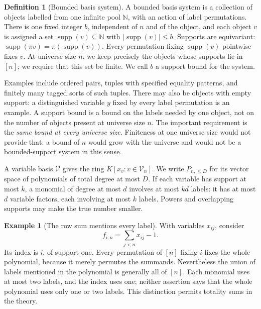 \documentclass[11pt,a4paper,oneside,openany]{book}
\theoremstyle{definition}\newtheorem{definition}[theorem]{Definition}
\newtheorem{example}[theorem]{Example}
\theoremstyle{remark}\newtheorem{remark}[theorem]{Remark}
\newcommand{\NN}{\mathbb N}\newcommand{\N}{\mathbb N}\newcommand{\Z}{\mathbb Z}\newcommand{\Q}{\mathbb Q}\newcommand{\Fp}{\mathbb F_p}
\DeclareMathOperator{\supp}{supp}\DeclareMathOperator{\im}{im}\DeclareMathOperator{\Span}{span}
\numberwithin{equation}{chapter}
\begin{document}
\begin{definition}[Bounded basis system]\label{tx:def:basis}
A bounded basis system is a collection of objects labelled from one
infinite pool $\NN$, with an action of label permutations. There is
one fixed integer $b$, independent of $n$ and of the object, and each
object $v$ is assigned a set $\supp(v)\subseteq\NN$ with
$|\supp(v)|\le b$. Supports are equivariant:
$\supp(\pi v)=\pi(\supp(v))$. Every permutation fixing
$\supp(v)$ pointwise fixes $v$. At universe size $n$, we keep precisely the
objects whose supports lie in $[n]$; we require that this set be finite.
We call $b$ a support bound for the system.
\end{definition}

Examples include ordered pairs, tuples with specified equality patterns,
and finitely many tagged sorts of such tuples. There may also be objects
with empty support: a distinguished variable $y$ fixed by every label
permutation is an example. A support bound is a bound on the labels
needed by one object, not on the number of objects present at universe size $n$.
The important requirement is the \emph{same bound at every universe size}.
Finiteness at one universe size would not provide that: a bound of $n$ would
grow with the universe and would not be a bounded-support system in
this sense.

A variable basis $\mathcal V$ gives the ring
$K[x_v:v\in\mathcal V_n]$. We write $P_{n,\le D}$ for its vector
space of polynomials of total degree at most $D$. If each variable has support at most $k$,
a monomial of degree at most $d$ involves at most $kd$ labels: it has
at most $d$ variable factors, each involving at most $k$ labels. Powers
and overlapping supports may make the true number smaller.

\begin{example}[The row sum mentions every label]\label{tx:eg:row-support}
With variables $x_{ij}$, consider
\[
                         f_{i,n}=\sum_{j<n}x_{ij}-1.
\]
Its index is $i$, of support one. Every permutation of $[n]$ fixing $i$ fixes the
whole polynomial, because it merely permutes the summands. Nevertheless
the union of labels mentioned in the polynomial is generally all of
$[n]$. Each monomial uses at most two labels, and the index uses one;
neither assertion says that the whole polynomial uses only one or two
labels. This distinction permits totality sums in the theory.
\end{example}
\end{document}
